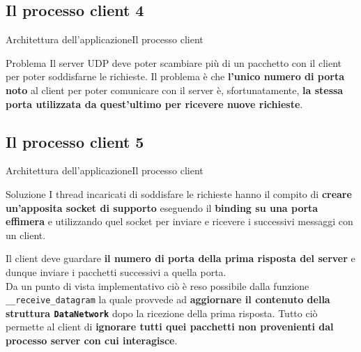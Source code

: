\documentclass[10pt]{beamer}
\begin{document}
\subsection{Il processo client 4}
\begin{frame}[fragile]{Architettura dell'applicazione}{Il processo client}

\begin{block}{Problema}
Il server UDP deve poter scambiare più di un pacchetto con il client per poter soddisfarne le richieste. Il problema è che \textbf{l'unico numero di porta noto} al client per poter comunicare con il server è, sfortunatamente, \textbf{la stessa porta utilizzata da quest'ultimo per ricevere nuove richieste}.
\end{block}

\end{frame}

\subsection{Il processo client 5}
\begin{frame}[fragile]{Architettura dell'applicazione}{Il processo client}

\begin{block}{Soluzione}
I thread incaricati di soddisfare le richieste hanno il compito di \textbf{creare un'apposita socket di supporto} eseguendo il \textbf{binding su una porta effimera} e utilizzando quel socket per inviare e ricevere i successivi messaggi con un client.
\end{block}

\vspace*{10px}
Il client deve guardare \textbf{il numero di porta della prima risposta del server} e dunque inviare i pacchetti successivi a quella porta. \\

\vspace*{10px}
Da un punto di vista implementativo ciò è reso possibile dalla funzione \texttt{\_\_receive\_datagram} la quale provvede ad \textbf{aggiornare il contenuto della struttura \texttt{DataNetwork}} dopo la ricezione della prima risposta. Tutto ciò permette al client di \textbf{ignorare tutti quei pacchetti non provenienti dal processo server con cui interagisce}.
\end{frame}
\end{document}

